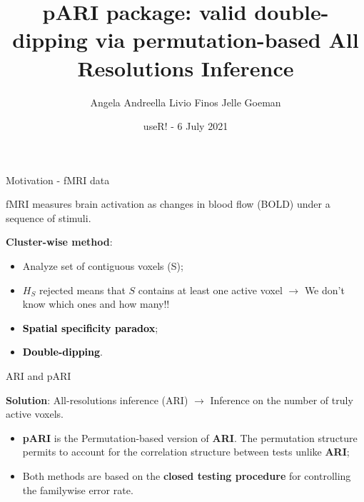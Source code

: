 \documentclass{beamer}
\title[scale=.1]{pARI package: valid double-dipping via permutation-based All Resolutions Inference}
\author[Angela Andreella]{Angela Andreella\inst{1} \hspace{1cm} Livio Finos\inst{2}  \hspace{1cm}  Jelle Goeman\inst{3}}
\institute[] %
{
	\inst{1}%
	Department of Statistical Sciences, University of Padua
	\vspace{1mm}	\\
	\inst{2}%
	Department of Developmental Psychology and Socialisation, University of Padua  \\
	\inst{3}%
	Biomedical Data Sciences, Leiden University Medical Center  \\
	
}
\date{useR! - 6 July 2021 }
\begin{document}

\begin{frame}
	\maketitle %
\end{frame}


\begin{frame}{Motivation - fMRI data}

fMRI measures brain activation as changes in blood flow (BOLD) under a sequence of stimuli. 
\vspace{.4cm} 

\textcolor{bluenight}{\textbf{Cluster-wise method}}:

\begin{itemize}
	
	\item Analyze set of contiguous voxels (S);
	\vspace{.4cm} 
	\item  $H_S$ rejected means that $S$ contains at least one active voxel $\rightarrow$ We don't know which ones and how many!!
	\vspace{.4cm}  
	\item \textcolor{black}{\textbf{Spatial specificity paradox}};
	\vspace{.4cm} 
	\item \textcolor{black}{\textbf{Double-dipping}}.
\end{itemize}

\end{frame}

\begin{frame}{ARI and pARI}

\textcolor{bluenight}{\textbf{Solution}}: All-resolutions inference (ARI) \footnotemark {} $\rightarrow$ Inference on the number of truly active voxels.

\vspace{.4cm}

\begin{itemize}
	\item \textcolor{bluenight}{\textbf{pARI}} is the Permutation-based version of \textcolor{bluenight}{\textbf{ARI}}. The permutation structure permits to account for the correlation structure between tests unlike \textcolor{bluenight}{\textbf{ARI}};
	\vspace{.4cm}
	\item Both methods are based on the \textcolor{bluenight}{\textbf{closed testing procedure}} for controlling the familywise error rate.
\end{itemize}



\end{frame}
\end{document}
